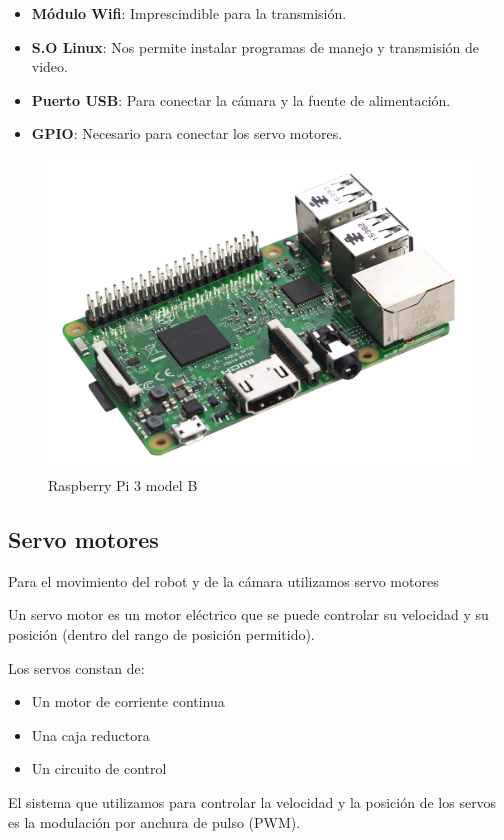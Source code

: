 \documentclass[twoside, 12pt]{epstfg}
\begin{document}
\begin{itemize}
	\item \textbf{Módulo Wifi}: Imprescindible para la transmisión.
	\item \textbf{S.O Linux}: Nos permite instalar programas de manejo y transmisión de video.
	\item \textbf{Puerto USB}: Para conectar la cámara y la fuente de alimentación.
	\item \textbf{GPIO}: Necesario para conectar los servo motores.
\end{itemize}


\begin{figure}[H]
	\centerline{
		\mbox{\includegraphics[width=.80\textwidth]{images/raspi3.jpg}}
	}
	\caption{Raspberry Pi 3 model B}
	
\end{figure}

\subsection{Servo motores}
Para el movimiento del robot y de la cámara utilizamos servo motores


Un servo motor es un motor eléctrico que se puede controlar su velocidad y su posición (dentro del rango de posición permitido).

Los servos constan de:
\begin{itemize}
	\item Un motor de corriente continua
	\item Una caja reductora
	\item Un circuito de control
\end{itemize}

El sistema que utilizamos para controlar la velocidad y la posición de los servos es la modulación por anchura de pulso (PWM).
\end{document}
